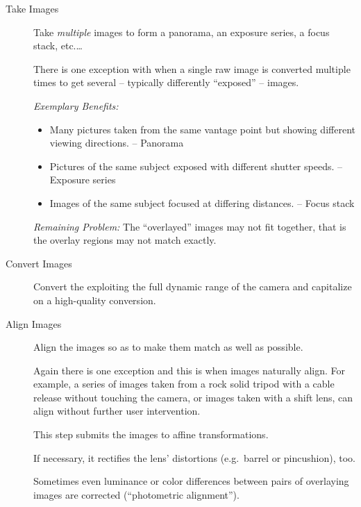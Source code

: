 \begin{description}
\item[Take Images]\itemend
  Take \emph{multiple} images to form a panorama, an exposure series, a focus stack, etc.\dots

  There is one exception with  when a single raw image is converted multiple
  times to get several -- typically differently ``exposed'' -- images.

  \noindent\emph{Exemplary Benefits:}

  \begin{itemize}
  \item
    Many pictures taken from the same vantage point but showing different viewing directions.
    -- Panorama

  \item
    Pictures of the same subject exposed with different shutter speeds.  -- Exposure series

  \item
    Images of the same subject focused at differing distances.  -- Focus stack
  \end{itemize}

  \noindent\emph{Remaining Problem:} The ``overlayed'' images may not fit together, that is the
  overlay regions may not match exactly.

\item[Convert Images]\itemend
  Convert the  exploiting the full dynamic range of
  the camera and capitalize on a high-quality conversion.

\item[Align Images]\itemend
  Align the images so as to make them match as well as possible.

  Again there is one exception and this is when images naturally align.  For example, a series
  of images taken from a rock solid tripod with a cable release without touching the camera, or
  images taken with a shift lens, can align without further user intervention.

  This step submits the images to affine transformations.

  If necessary, it rectifies the lens' distortions (e.g.\ barrel or pincushion), too.

  Sometimes even luminance or color differences between pairs of overlaying images are corrected
  (``photometric alignment'').


\end{description}
